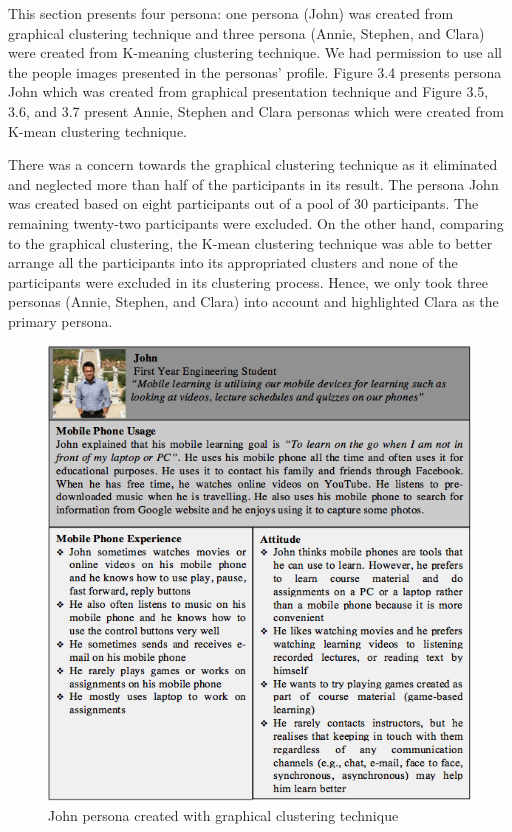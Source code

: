 This section presents four persona: one persona (John) was created from graphical clustering technique and three persona (Annie, Stephen, and Clara) were created from K-meaning clustering technique. We had permission to use all the people images presented in the personas' profile. Figure 3.4 presents persona John which was created from graphical presentation technique and Figure 3.5, 3.6, and 3.7 present Annie, Stephen and Clara personas which were created from K-mean clustering technique. 

There was a concern towards the graphical clustering technique as it eliminated and neglected more than half of the participants in its result. The persona John was created based on eight participants out of a pool of 30 participants. The remaining twenty-two participants were excluded. On the other hand, comparing to the graphical clustering, the K-mean clustering technique was able to better arrange all the participants into its appropriated clusters and none of the participants were excluded in its clustering process. Hence, we only took three personas (Annie, Stephen, and Clara) into account and highlighted Clara as the primary persona. 


\newpage 
\begin{figure}[!hbt]
\centering
\includegraphics[width=1 \textwidth]{persona2}
\caption{John persona created with graphical clustering technique}
\end{figure}


